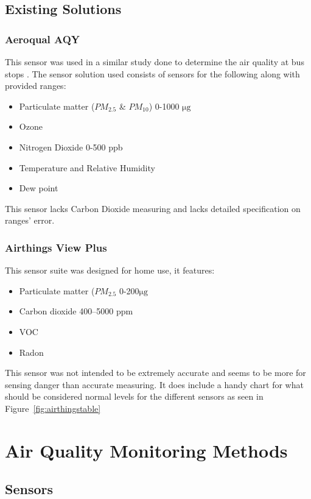 \pagebreak
\subsection{Existing Solutions}

\subsubsection{Aeroqual AQY}
This sensor was used in a similar study done to determine the air quality at bus stops \cite{busstop}. 
The sensor solution used consists of sensors for the following along with provided ranges\cite{sensoraq}:

\begin{itemize}
	\item Particulate matter ($PM_{2.5}$ \& $PM_{10}$) 0-1000 $ \si{\micro\gram}$
	\item Ozone
	\item Nitrogen Dioxide 0-500 ppb
	\item Temperature and Relative Humidity
	\item Dew point
\end{itemize}
This sensor lacks Carbon Dioxide measuring and lacks detailed specification on ranges' error.


\subsubsection{Airthings View Plus}
This sensor suite was designed for home use, it features:
\begin{itemize}
	\item Particulate matter ($PM_{2.5}$ 0-200$ \si{\micro\gram}$
	\item Carbon dioxide 400–5000 ppm
	\item VOC
	\item Radon
\end{itemize}
This sensor was not intended to be extremely accurate and seems to be more for sensing danger than accurate measuring.
It does include a handy chart for what should be considered normal levels for the different sensors as seen in Figure~\ref{fig:airthingstable}




\section{Air Quality Monitoring Methods}

\subsection{Sensors}
